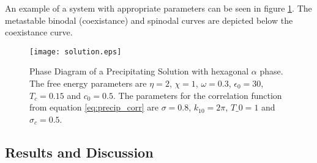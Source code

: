 An example of a system with appropriate parameters can be seen in figure
\ref{fig:precip_phase_dia}. The metastable binodal (coexistance) and spinodal
curves are depicted below the coexistance curve.

\begin{figure}
    \centering	
    \texttt{[image: solution.eps]}
    \caption[Coexistance Phase Diagram with Metastable Spinodal]{
        \label{fig:precip_phase_dia} Phase Diagram of a Precipitating Solution
        with hexagonal $\alpha$ phase. The free energy parameters are $\eta =
        2$, $\chi = 1$, $\omega=0.3$, $\epsilon_0=30$, $T_c = 0.15$ and
        $c_0=0.5$. The parameters for the correlation function from equation
        \ref{eq:precip_corr} are $\sigma = 0.8$, $k_{10} = 2\pi$, $T\_0 = 1$
        and $\sigma_c = 0.5$.
    }
\end{figure}

\subsection{Results and Discussion} %


